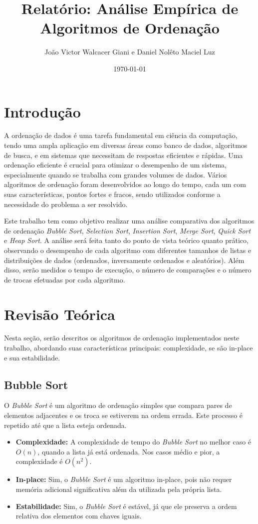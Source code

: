 \documentclass[a4paper,12pt]{article}
\title{Relatório: Análise Empírica de Algoritmos de Ordenação}
\author{João Victor Walcacer Giani e Daniel Nolêto Maciel Luz}
\date{\today}
\begin{document}
\maketitle

\newpage

\section{Introdução}

A ordenação de dados é uma tarefa fundamental em ciência da computação, tendo uma ampla aplicação em diversas áreas como banco de dados, algoritmos de busca, e em sistemas que necessitam de respostas eficientes e rápidas. Uma ordenação eficiente é crucial para otimizar o desempenho de um sistema, especialmente quando se trabalha com grandes volumes de dados. Vários algoritmos de ordenação foram desenvolvidos ao longo do tempo, cada um com suas características, pontos fortes e fracos, sendo utilizados conforme a necessidade do problema a ser resolvido.

Este trabalho tem como objetivo realizar uma análise comparativa dos algoritmos de ordenação \textit{Bubble Sort}, \textit{Selection Sort}, \textit{Insertion Sort}, \textit{Merge Sort}, \textit{Quick Sort} e \textit{Heap Sort}. A análise será feita tanto do ponto de vista teórico quanto prático, observando o desempenho de cada algoritmo com diferentes tamanhos de listas e distribuições de dados (ordenados, inversamente ordenados e aleatórios). Além disso, serão medidos o tempo de execução, o número de comparações e o número de trocas efetuadas por cada algoritmo.

\section{Revisão Teórica}

Nesta seção, serão descritos os algoritmos de ordenação implementados neste trabalho, abordando suas características principais: complexidade, se são in-place e sua estabilidade.

\subsection{Bubble Sort}
O \textit{Bubble Sort} é um algoritmo de ordenação simples que compara pares de elementos adjacentes e os troca se estiverem na ordem errada. Este processo é repetido até que a lista esteja ordenada.

\begin{itemize}
    \item \textbf{Complexidade:} A complexidade de tempo do \textit{Bubble Sort} no melhor caso é $O(n)$, quando a lista já está ordenada. Nos casos médio e pior, a complexidade é $O(n^2)$.
    \item \textbf{In-place:} Sim, o \textit{Bubble Sort} é um algoritmo in-place, pois não requer memória adicional significativa além da utilizada pela própria lista.
    \item \textbf{Estabilidade:} Sim, o \textit{Bubble Sort} é estável, já que ele preserva a ordem relativa dos elementos com chaves iguais.
\end{itemize}
\end{document}
